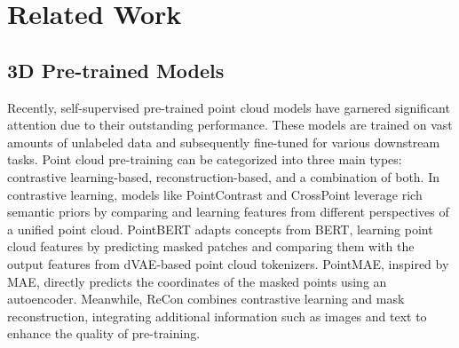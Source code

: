 \section{Related Work}
\label{sec:relatedwork}

\subsection{3D Pre-trained Models}

Recently, self-supervised pre-trained point cloud models have garnered significant attention due to their outstanding performance. These models are trained on vast amounts of unlabeled data and subsequently fine-tuned for various downstream tasks. Point cloud pre-training can be categorized into three main types: contrastive learning-based, reconstruction-based, and a combination of both. In contrastive learning, models like PointContrast\cite{xie2020pointcontrast} and CrossPoint\cite{afham2022crosspoint} leverage rich semantic priors by comparing and learning features from different perspectives of a unified point cloud. PointBERT\cite{yu2022point} adapts concepts from BERT\cite{devlin2018bert}, learning point cloud features by predicting masked patches and comparing them with the output features from dVAE-based point cloud tokenizers. PointMAE\cite{pang2022masked}, inspired by MAE\cite{he2022masked}, directly predicts the coordinates of the masked points using an autoencoder. Meanwhile, ReCon\cite{qi2023contrast} combines contrastive learning and mask reconstruction, integrating additional information such as images and text to enhance the quality of pre-training.

